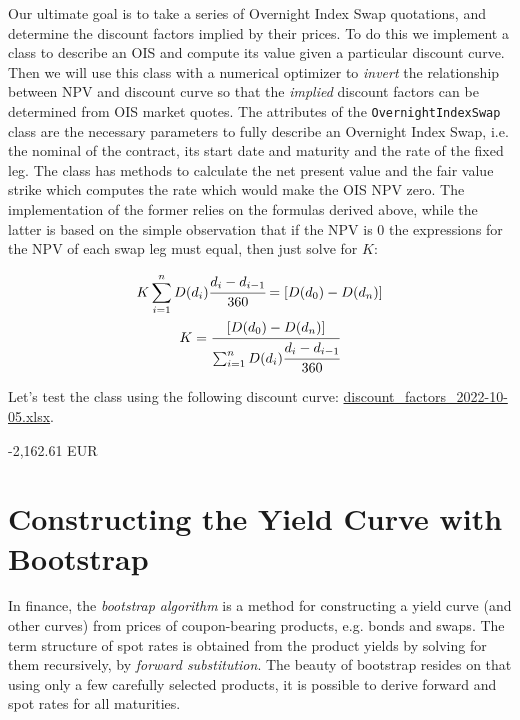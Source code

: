 \begin{finmarkets}
Our ultimate goal is to take a series of Overnight Index Swap quotations, and determine the discount factors implied by their prices. To do this we
implement a class to describe an OIS and compute its value given a particular discount curve. Then we will use this class with a numerical optimizer
to \emph{invert} the relationship between NPV and discount curve so that the \emph{implied} discount factors can be determined from OIS market quotes.
The attributes of the \texttt{OvernightIndexSwap} class are the necessary parameters to fully describe an Overnight Index Swap, i.e. the nominal of the
contract, its start date and maturity and the rate of the fixed leg. The class has methods to calculate the net present value and the fair value strike
which computes the rate which would make the OIS NPV zero. The implementation of the former relies on the formulas derived above, while the latter is
based on the simple observation that if the NPV is 0 the expressions for the NPV of each swap leg must equal, then just solve for $K$:

\begin{equation}
\begin{gathered}
K \sum_{i=1}^{n}D(d_{i})\cfrac{d_i - d_{i-1}}{360} = [D(d_0) - D(d_n)] \\
K = \cfrac{[D(d_0) - D(d_n)]}{\sum_{i=1}^{n}D(d_{i})\cfrac{d_i - d_{i-1}}{360}}
\end{gathered}
\end{equation}
\end{finmarkets}

\noindent
Let's test the class using the following discount curve:
\href{https://github.com/matteosan1/finance_course/raw/master/input_files/discount_factors_2022-10-05.xlsx}{discount\_factors\_2022-10-05.xlsx}.

\begin{ioutput}
-2,162.61 EUR
\end{ioutput}

\section{Constructing the Yield Curve with Bootstrap}
\label{sec:the-bootstrapping-technique}

In finance, the \emph{bootstrap algorithm} is a method for constructing a yield curve (and other curves) from prices of coupon-bearing products, e.g. bonds and swaps.
The term structure of spot rates is obtained from the product yields by solving for them recursively, by \emph{forward substitution}.
The beauty of bootstrap resides on that using only a few carefully selected products, it is possible to derive forward and spot rates for all maturities.

